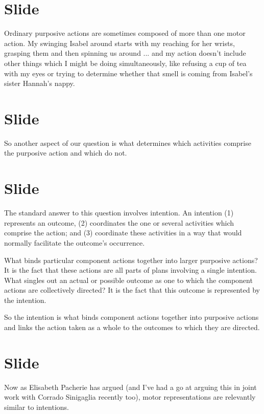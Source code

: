\documentclass[12pt,\papersize]{extarticle}
\begin{document}
\section{Slide}
Ordinary purposive actions are sometimes composed of more than one motor action.  My swinging Isabel around starts with my reaching for her wrists, grasping them and then spinning us around ... and my action doesn’t include other things which I might be doing simultaneously, like refusing a cup of tea with my eyes or  trying to determine whether that smell is coming from Isabel’s sister Hannah’s nappy.



\section{Slide}
So another aspect of our question is what determines which activities comprise the purposive action and which do not.





\section{Slide}
The standard answer to this question involves intention.
An intention (1) represents an outcome, (2) coordinates the one or several activities which comprise the action; and (3) coordinate these activities in a way that would normally facilitate the outcome’s occurrence.

What binds particular component actions together into larger purposive actions?  It is the fact that these actions are all parts of plans involving a single intention.
What singles out an actual or possible outcome as one to which the component actions are collectively directed?  It is the fact that this outcome is represented by the intention.

So the intention is what binds component actions together into purposive actions and links the action taken as a whole to the outcomes to which they are directed.



\section{Slide}
Now as Elisabeth Pacherie has argued \citep[pp.\ 189-90]{pacherie:2008_action} (and I’ve had a go at arguing this in joint work with Corrado Sinigaglia recently too),
motor representations are relevantly similar to intentions.
\end{document}

